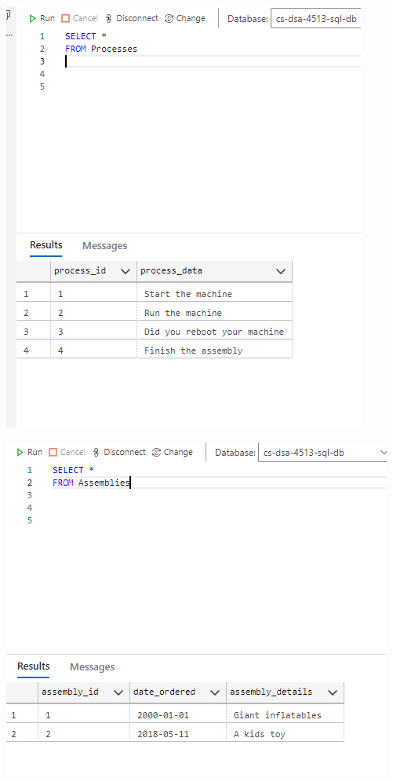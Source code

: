 \documentclass[11pt]{article}
\begin{document}
\includegraphics[width = \textwidth]{processTable.png}

\includegraphics[width = \textwidth]{assTable.png}
\end{document}
